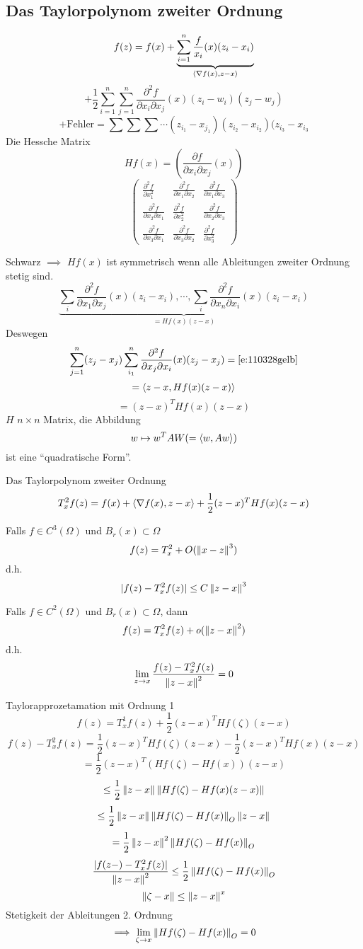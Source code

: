 \subsection{Das Taylorpolynom zweiter Ordnung}
\[f(z)=f(x)+\underbrace{\sum^n_{i=1}\dfrac{f}{x_i}(x)(z_i-x_i)}_{\langle \nabla f(x), z-x \rangle}\]
\begin{equation}
  \label{e:110328gelb}
  +\frac{1}{2}\sum^n_{i=1}\sum^n_{j=1}\frac{\partial^2f}{\partial x_i\partial x_j}(x)(z_i-w_i)(z_j-w_j)
\end{equation}
\[+ \text{Fehler} = \sum\sum\sum\cdots(z_{i_1}-x_{j_1})(z_{i_2}-x_{i_2})(z_{i_3}-x_{i_3}\]
Die Hessche Matrix
\[Hf(x)=\left( \frac{\partial f}{\partial x_i\partial x_j}(x) \right)\]
\[ \begin{pmatrix}
  \frac{\partial^2 f}{\partial x_1^2} & \frac{\partial^2 f}{\partial x_1\partial x_2} & \frac{\partial^2 f}{\partial x_1\partial x_3} \\
  \frac{\partial^2 f}{\partial x_2\partial x_1} & \frac{\partial^2 f}{\partial x_2^2} & \frac{\partial^2 f}{\partial x_2\partial x_3} \\
  \frac{\partial^2 f}{\partial x_3\partial x_1} & \frac{\partial^2 f}{\partial x_3\partial x_2}& \frac{\partial^2 f}{\partial x_3^2}
\end{pmatrix}\]
\begin{Bem}
  Schwarz $\implies$ $Hf(x)$ ist symmetrisch wenn alle Ableitungen zweiter Ordnung stetig sind.
  \[\underbrace{\sum_i\frac{\partial^2 f}{\partial x_1\partial x_j}(x)(z_i-x_i),\cdots,\sum_i\frac{\partial^2 f}{\partial x_n\partial x_i}(x)(z_i-x_i)}_{=Hf(x)(z-x)}\]
  Deswegen
  \[\sum^n_{j=1}(z_j-x_j)\sum^n_{i_1}\frac{\partial^2 f}{\partial x_j\partial x_i}(x)(z_j-x_j)=\ref{e:110328gelb}\]
  \[=\langle z-x, Hf(x)(z-x) \rangle\]
  \[=(z-x)^THf(x)(z-x)\]
  $H$ $n\times n$ Matrix, die Abbildung
  \[w\mapsto w^T A W (=\langle w,Aw \rangle)\]
  ist eine ``quadratische Form''.
\end{Bem}
Das Taylorpolynom zweiter Ordnung
\[T^2_xf(z)=f(x)+\langle \nabla f(x), z-x \rangle+\frac{1}{2}(z-x)^T Hf(x)(z-x)\]
\begin{Kor}
  Falls $f\in C^3(\Omega)$ und $B_r(x)\subset\Omega$
  \[f(z)=T^2_x+O(\left\| x-z \right\|^3)\]
  d.h.
  \[\mathopen| f(z)-T_x^2f(z) \mathclose|\leq C\left\| z-x \right\|^3\]
\end{Kor}
\begin{Kor}
  Falls $f\in C^2(\Omega)$ und $B_r(x)\subset\Omega$, dann
  \[f(z)=T^2_xf(z)+o(\left\| z-x \right\|^2)\]
  d.h.
  \[\lim_{z\rightarrow x}\frac{f(z)-T_x^2f(z)}{\left\| z-x \right\|^2}=0\]
\end{Kor}
\begin{Bew}
  Taylorapprozetamation mit Ordnung 1
  \[f(z)=T^1_xf(z)+\frac{1}{2}(z-x)^THf(\zeta)(z-x)\]
  \[f(z)-T_x^2f(z)=\frac{1}{2}(z-x)^THf(\zeta)(z-x)-\frac{1}{2}(z-x)^THf(x)(z-x)\]
  \[=\frac{1}{2}(z-x)^T(Hf(\zeta)-Hf(x))(z-x)\]
  \[\leq \frac{1}{2}\left\| z-x \right\|\left\| Hf(\zeta)-Hf(x)(z-x) \right\|\]
  \[\leq \frac{1}{2}\left\| z-x \right\|\left\| Hf(\zeta)-Hf(x) \right\|_O\left\| z-x \right\|\]
  \[= \frac{1}{2}\left\| z-x \right\|^2\left\| Hf(\zeta)-Hf(x) \right\|_O\]
  \[\frac{\mathopen| f(z-)-T_x^2f(z) \mathclose|}{\left\| z-x \right\|^2}\leq\frac{1}{2}\left\| Hf(\zeta)-Hf(x) \right\|_O\]
  \[\left\| \zeta-x \right\|\leq\left\| z-x \right\|^x\]
  Stetigkeit der Ableitungen 2. Ordnung
  \[\implies \lim_{\zeta\rightarrow x}\left\| Hf(\zeta)-Hf(x) \right\|_O=0\]
\end{Bew}
